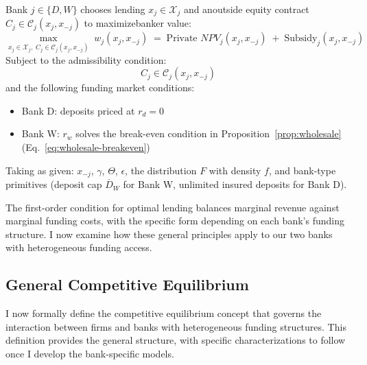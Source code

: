 \documentclass[12pt]{article}
\begin{document}
\begin{definition}\label{def:bank-opt}
Bank $j \in \{D,W\}$ chooses lending $x_j \in \mathcal{X}_j$ and an\Allow outside equity contract $C_j\in\mathcal{C}_j(x_j,x_{-j})$ to maximize\Allow banker value:
\begin{equation}
    \max_{x_j \in \mathcal{X}_j,\; C_j\in\mathcal{C}_j(x_j,x_{-j})} \; w_{j}(x_{j},x_{-j}) \;=\; \text{Private } NPV_{j}(x_j,x_{-j}) \; + \; \text{Subsidy}_{j}(x_j,x_{-j})
\end{equation}
Subject to the admissibility condition:
\[
    C_j \in \mathcal{C}_j(x_j,x_{-j})
\]
and the following funding market conditions:
\begin{itemize}
    \item Bank D: deposits priced at $r_d = 0$
    \item Bank W: $r_w$ solves the break-even condition in Proposition~\ref{prop:wholesale} (Eq.~\eqref{eq:wholesale-breakeven})
\end{itemize}

\noindent Taking as given: $x_{-j}$, $\gamma$, $\Theta$, $\epsilon$, the distribution $F$ with density $f$, and bank-type primitives (deposit cap $\overline{D}_W$ for Bank W, unlimited insured deposits for Bank D).
\end{definition}

The first-order condition for optimal lending balances marginal revenue against marginal funding costs, with the specific form depending on each bank's funding structure. I now examine how these general principles apply to our two banks with heterogeneous funding access.

\subsection{General Competitive Equilibrium}
I now formally define the competitive equilibrium concept that governs the interaction between firms and banks with heterogeneous funding structures. This definition provides the general structure, with specific characterizations to follow once I develop the bank-specific models.
\end{document}
